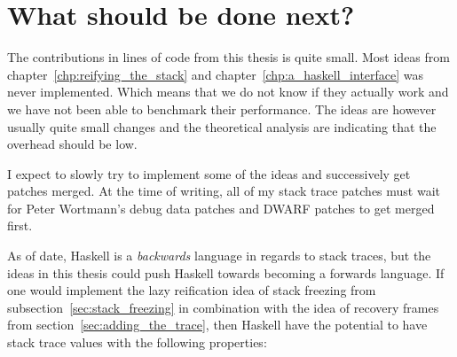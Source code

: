 \section{What should be done next?}

The contributions in lines of code from this thesis is quite small.
Most ideas from chapter~\ref{chp:reifying_the_stack} and chapter~\ref{chp:a_haskell_interface} was never implemented. Which means that we
do not know if they actually work and we have not been able to benchmark
their performance. The ideas are however usually quite small changes and
the theoretical analysis are indicating that the overhead should be low.

I expect to slowly try to implement some of the ideas and successively
get patches merged. At the time of writing, all of my stack trace patches
must wait for Peter Wortmann's debug data patches and DWARF patches to
get merged first.

As of date, Haskell is a \emph{backwards} language in regards to stack
traces, but the ideas in this thesis could push Haskell towards becoming
a forwards language. If one would implement the lazy reification
idea of stack freezing from subsection~\ref{sec:stack_freezing}
in combination with the idea of recovery frames from section~\ref{sec:adding_the_trace}, then Haskell have the potential to have
stack trace values with the following properties:

